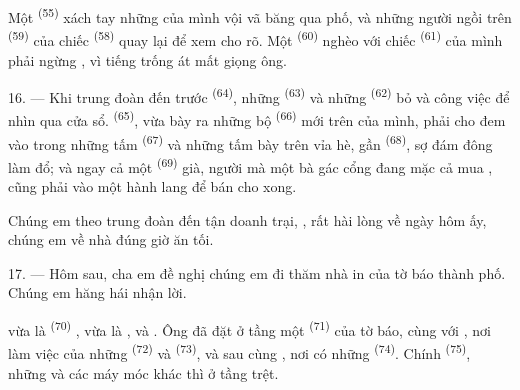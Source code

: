 \VUsaut{3.0mm}

Một  \textsuperscript{(55)} xách tay những 
của mình vội vã băng qua phố, và những người ngồi trên 
\textsuperscript{(59)} của chiếc  \textsuperscript{(58)} quay lại để
xem cho rõ. Một  \textsuperscript{(60)} nghèo với chiếc  \textsuperscript{(61)} của mình phải ngừng , vì tiếng trống át mất
giọng ông.

16. --- Khi trung đoàn đến trước  \textsuperscript{(64)}, những
 \textsuperscript{(63)} và những 
\textsuperscript{(62)} bỏ  và công việc để nhìn qua cửa sổ.
 \textsuperscript{(65)}, vừa bày ra những bộ 
\textsuperscript{(66)} mới trên  của mình, phải cho đem vào trong những
tấm  \textsuperscript{(67)} và những tấm  bày trên vỉa hè, gần
 \textsuperscript{(68)}, sợ đám đông làm đổ; và ngay cả một  \textsuperscript{(69)} già, người mà một bà gác cổng đang mặc cả mua
, cũng phải vào một hành lang để bán cho xong.

Chúng em theo trung đoàn đến tận doanh trại, , rất hài lòng về ngày hôm ấy,
chúng em về nhà đúng giờ ăn tối.

\VUsaut{3.0mm}

17. --- Hôm sau, cha em đề nghị chúng em đi thăm nhà in của tờ báo thành phố. Chúng em
hăng hái nhận lời.

 vừa là  \textsuperscript{(70)}
, vừa là ,  và
. Ông đã đặt ở tầng một  \textsuperscript{(71)}
của tờ báo, cùng với , nơi làm việc của những 
\textsuperscript{(72)} và  \textsuperscript{(73)}, và sau cùng
, nơi có những  \textsuperscript{(74)}. Chính
 \textsuperscript{(75)}, những  và các máy móc khác thì ở
tầng trệt.

\VUsaut{3.0mm}

